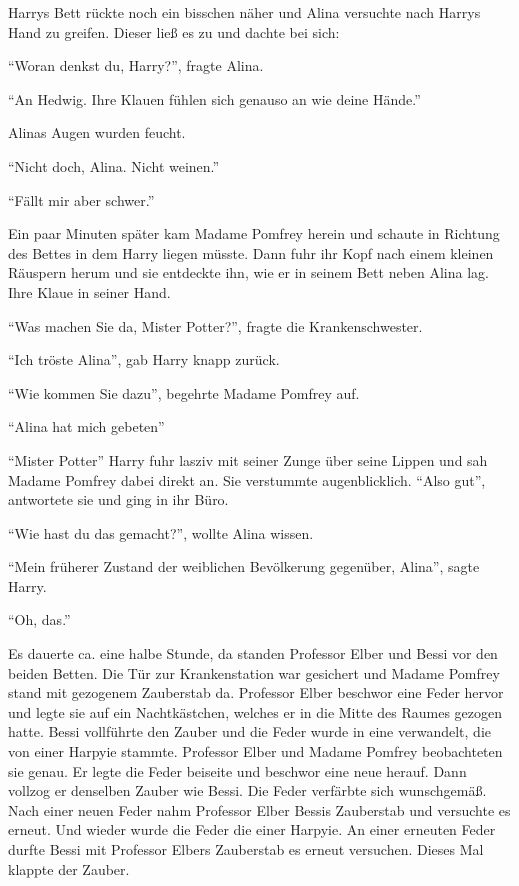 Harrys Bett rückte noch ein bisschen näher und Alina versuchte nach Harrys Hand zu greifen. Dieser ließ es zu und dachte bei sich: 

\enquote{Woran denkst du, Harry?}, fragte Alina.

\enquote{An Hedwig. Ihre Klauen fühlen sich genauso an wie deine Hände.}

Alinas Augen wurden feucht.

\enquote{Nicht doch, Alina. Nicht weinen.}

\enquote{Fällt mir aber schwer.}

Ein paar Minuten später kam Madame Pomfrey herein und schaute in Richtung des Bettes in dem Harry liegen müsste. Dann fuhr ihr Kopf nach einem kleinen Räuspern herum und sie entdeckte ihn, wie er in seinem Bett neben Alina lag. Ihre Klaue in seiner Hand.

\enquote{Was machen Sie da, Mister Potter?}, fragte die Krankenschwester.

\enquote{Ich tröste Alina}, gab Harry knapp zurück.

\enquote{Wie kommen Sie dazu\abs}, begehrte Madame Pomfrey auf.

\enquote{Alina hat mich gebeten\abs}

\enquote{Mister Potter\abs} Harry fuhr lasziv mit seiner Zunge über seine Lippen und sah Madame Pomfrey dabei direkt an. Sie verstummte augenblicklich. \enquote{Also gut}, antwortete sie und ging in ihr Büro.

\enquote{Wie hast du das gemacht?}, wollte Alina wissen.

\enquote{Mein früherer Zustand der weiblichen Bevölkerung gegenüber, Alina}, sagte Harry.

\enquote{Oh, das.}

Es dauerte ca. eine halbe Stunde, da standen Professor Elber und Bessi vor den beiden Betten. Die Tür zur Krankenstation war gesichert und Madame Pomfrey stand mit gezogenem Zauberstab da. Professor Elber beschwor eine Feder hervor und legte sie auf ein Nachtkästchen, welches er in die Mitte des Raumes gezogen hatte. Bessi vollführte den Zauber und die Feder wurde in eine verwandelt, die von einer Harpyie stammte. Professor Elber und Madame Pomfrey beobachteten sie genau. Er legte die Feder beiseite und beschwor eine neue herauf. Dann vollzog er denselben Zauber wie Bessi. Die Feder verfärbte sich wunschgemäß. Nach einer neuen Feder nahm Professor Elber Bessis Zauberstab und versuchte es erneut. Und wieder wurde die Feder die einer Harpyie. An einer erneuten Feder durfte Bessi mit Professor Elbers Zauberstab es erneut versuchen. Dieses Mal klappte der Zauber.

